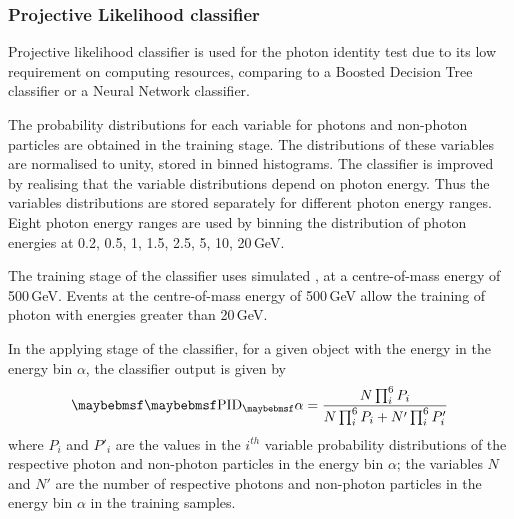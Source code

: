 
\subsubsection{Projective Likelihood classifier}


Projective likelihood classifier   is used  for the photon identity test due to its  low requirement on computing resources, comparing to a Boosted Decision Tree classifier or a Neural Network classifier.

The probability distributions for each variable for photons and non-photon particles are obtained in the training stage. The distributions of these variables are normalised to unity, stored in binned histograms. The classifier is improved by realising that the variable distributions depend on photon energy. Thus the variables distributions are stored separately for different photon energy ranges. Eight photon energy ranges are used by binning the distribution of photon energies at 0.2, 0.5, 1, 1.5, 2.5, 5, 10, 20\,GeV.


The training stage of the classifier uses simulated  \eeZuds, at a centre-of-mass energy of 500\,GeV. Events at the centre-of-mass energy of 500\,GeV allow the training of photon with energies greater than 20\,GeV.


In the applying stage of the classifier, for a given \ShowerPeak object with the energy in the  energy bin $\alpha$, the classifier output is given by
\begin{equation}
\uprightMath{PID_\alpha} = \frac{N \prod_{i}^6{P_{i}}}{N \prod_{i}^6{P_{i}} + N' \prod_{i}^6{P'_{i}}}
\end{equation}
where $P_{i}$ and $P'_{i}$ are the values in the $i^{th}$ variable probability distributions  of the  respective photon and non-photon particles in the energy bin $\alpha$; the variables $N$ and $N'$ are the number of respective photons and non-photon particles in the energy bin $\alpha$ in the training samples.


